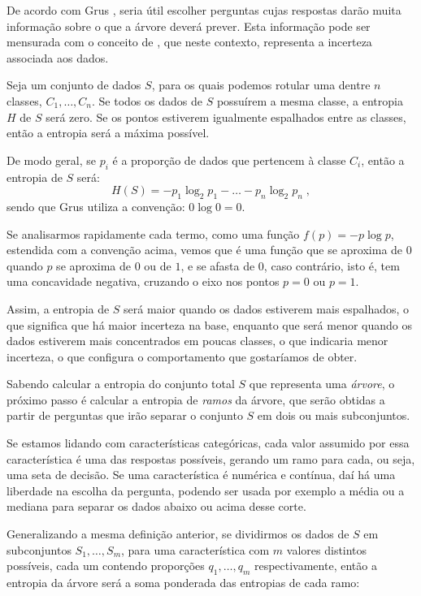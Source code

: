 De acordo com Grus \citep{data}, seria útil escolher perguntas cujas respostas darão muita informação sobre o que a árvore deverá prever. Esta informação pode ser mensurada com o conceito de , que neste contexto, representa a incerteza associada aos dados.

Seja um conjunto de dados $S$, para os quais podemos rotular uma dentre $n$ classes, $C_1, \ldots, C_n$. Se todos os dados de $S$ possuírem a mesma classe, a entropia $H$ de $S$ será zero. Se os pontos estiverem igualmente espalhados entre as classes, então a entropia será a máxima possível.

De modo geral, se $p_i$ é a proporção de dados que pertencem à classe $C_i$, então a entropia de $S$ será:
\begin{equation}\label{eq:entropia_1}
H(S) = -p_1 \log_2 p_1 - \ldots - p_n \log_2 p_n \; ,
\end{equation}
sendo que Grus \citep{data} utiliza a convenção: $0 \log 0 = 0$.

Se analisarmos rapidamente cada termo, como uma função $f(p) = {-p} \log p$, estendida com a convenção acima, vemos que é uma função que se aproxima de $0$ quando $p$ se aproxima de $0$ ou de $1$, e se afasta de $0$, caso contrário, isto é, tem uma concavidade negativa, cruzando o eixo nos pontos $p=0$ ou $p=1$.

Assim, a entropia de $S$ será maior quando os dados estiverem mais espalhados, o que significa que há maior incerteza na base, enquanto que será menor quando os dados estiverem mais concentrados em poucas classes, o que indicaria menor incerteza, o que configura o comportamento que gostaríamos de obter.

Sabendo calcular a entropia do conjunto total $S$ que representa uma \emph{árvore}, o próximo passo é calcular a entropia de \emph{ramos} da árvore, que serão obtidas a partir de perguntas que irão separar o conjunto $S$ em dois ou mais subconjuntos.

Se estamos lidando com características categóricas, cada valor assumido por essa característica é uma das respostas possíveis, gerando um ramo para cada, ou seja, uma seta de decisão. Se uma característica é numérica e contínua, daí há uma liberdade na escolha da pergunta, podendo ser usada por exemplo a média ou a mediana para separar os dados abaixo ou acima desse corte.

Generalizando a mesma definição anterior, se dividirmos os dados de $S$ em subconjuntos $S_1, \ldots, S_m$, para uma característica com $m$ valores distintos possíveis, cada um contendo proporções $q_1, \ldots, q_m$ respectivamente, então a entropia da árvore será a soma ponderada das entropias de cada ramo:

